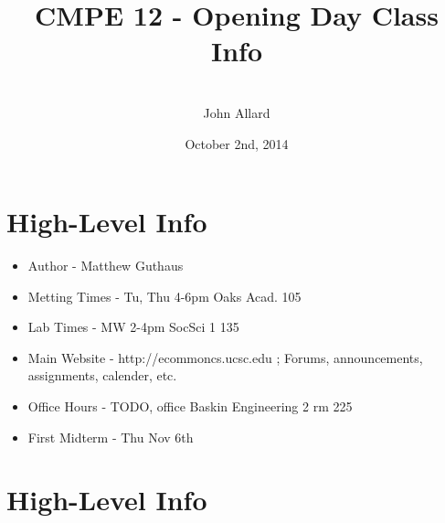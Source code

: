 \documentclass[a4paper,11pt]{article}
\title{CMPE 12 - Opening Day Class Info}
\author{ \\[7in] John Allard}
\date{October 2nd, 2014 \\}
\begin{document}
\section{High-Level Info}
\begin{itemize}
\item Author - Matthew Guthaus
\item Metting Times - Tu, Thu 4-6pm Oaks Acad. 105
\item Lab Times - MW 2-4pm SocSci 1 135
\item Main Website - http://ecommoncs.ucsc.edu ; Forums, announcements, assignments, calender, etc.
\item Office Hours - TODO, office Baskin Engineering 2 rm 225
\item First Midterm - Thu Nov 6th
\end{itemize}

\section{High-Level Info}
\end{document}
